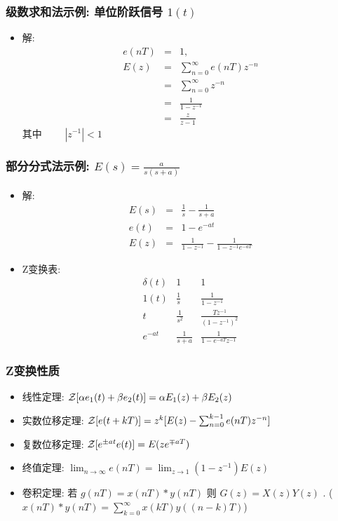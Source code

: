 \documentclass[table]{beamer}
\begin{document}
\begin{frame}
\frametitle{级数求和法示例: 单位阶跃信号 $1(t)$}
\label{sec-3-1-4}

\begin{itemize}
\item <2-> 解: 
       \begin{eqnarray*}
       e(nT)&=&1 , \\
       E(z) &=  &\sum_{n=0}^{\infty}e(nT)z^{-n} \\
       	&=& \sum_{n=0}^{\infty}z^{-n} \\
       &=& \frac{1}{1-z^{-1}} \\
       &=& \frac{z}{z-1}
       \end{eqnarray*}
       其中  $\qquad |z^{-1}|<1$
\end{itemize}
\end{frame}
\begin{frame}
\frametitle{部分分式法示例:  $E(s)=\frac{a}{s(s+a)}$}
\label{sec-3-1-5}

\begin{itemize}
\item <2->解:
      \begin{eqnarray*}
      E(s) & = & \frac{1}{s}-\frac{1}{s+a}\\
      e(t) &=& 1-e^{-at} \\
      E(z) &=& \frac{1}{1-z^{-1}} -\frac{1}{1-z^{-1}e^{-aT}}
      \end{eqnarray*}
\item <3->Z变换表:
      \[\begin{matrix}
      \delta(t) & 1 & 1 \\
      1(t) & \frac{1}{s} & \frac{1}{1-z^{-1}} \\
      t & \frac{1}{s^2} & \frac{Tz^{-1}}{(1-z^{-1})^2} \\
      e^{-at} & \frac{1}{s+a} &\frac{1}{1-e^{-aT}z^{-1}}
      \end{matrix}\]
\end{itemize}
\end{frame}
\begin{frame}
\frametitle{Z变换性质}
\label{sec-3-1-6}

\begin{itemize}
\item <2->线性定理:    ${\cal Z}[\alpha e_1(t)+\beta e_2(t)]=\alpha E_1(z)+\beta E_2(z)$
\item <3->实数位移定理:  ${\cal Z}[e(t+kT)] = z^k[E(z)-\sum_{n=0}^{k-1}e(nT)z^{-n}]$
\item <4->复数位移定理:  ${\cal Z}[e^{\pm at}e(t)] = E(ze^{\mp aT})$
\item <5->终值定理:  $\lim_{n\rightarrow\infty}e(nT)=\lim_{z\rightarrow 1}(1-z^{-1})E(z)$
\item <6->卷积定理: 若  $g(nT)=x(nT)*y(nT)$  则  $G(z)=X(z)Y(z)$  . ($x(nT)*y(nT)=\sum_{k=0}^{\infty}x(kT)y((n-k)T)$)
\end{itemize}
\end{frame}
\end{document}
